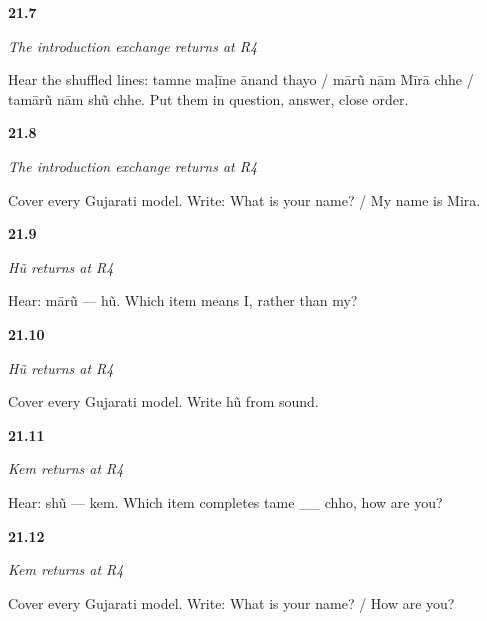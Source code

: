 \noindent\begin{minipage}[t]{\linewidth}
\raggedright
\hypertarget{review-GU-R17-introduction-r4-listening}{\textbf{21.7}} \emph{The introduction exchange returns at R4}\par
\small Hear the shuffled lines: tamne maḷīne ānand thayo / mārũ nām Mīrā chhe / tamārũ nām shũ chhe. Put them in question, answer, close order.
\end{minipage}\par\medskip

\noindent\begin{minipage}[t]{\linewidth}
\raggedright
\hypertarget{review-GU-R17-introduction-r4-writing}{\textbf{21.8}} \emph{The introduction exchange returns at R4}\par
\small Cover every Gujarati model. Write: What is your name? / My name is Mira.
\end{minipage}\par\medskip

\noindent\begin{minipage}[t]{\linewidth}
\raggedright
\hypertarget{review-GU-R17-hun-r4-listening}{\textbf{21.9}} \emph{Hũ returns at R4}\par
\small Hear: mārũ — hũ. Which item means I, rather than my?
\end{minipage}\par\medskip

\noindent\begin{minipage}[t]{\linewidth}
\raggedright
\hypertarget{review-GU-R17-hun-r4-writing}{\textbf{21.10}} \emph{Hũ returns at R4}\par
\small Cover every Gujarati model. Write hũ from sound.
\end{minipage}\par\medskip

\noindent\begin{minipage}[t]{\linewidth}
\raggedright
\hypertarget{review-GU-R17-kem-r4-listening}{\textbf{21.11}} \emph{Kem returns at R4}\par
\small Hear: shũ — kem. Which item completes tame \_\_ chho, how are you?
\end{minipage}\par\medskip

\noindent\begin{minipage}[t]{\linewidth}
\raggedright
\hypertarget{review-GU-R17-kem-r4-writing}{\textbf{21.12}} \emph{Kem returns at R4}\par
\small Cover every Gujarati model. Write: What is your name? / How are you?
\end{minipage}\par\medskip

